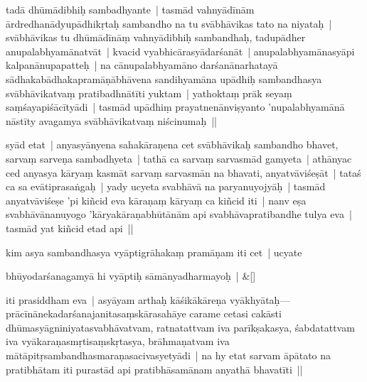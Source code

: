 \documentclass[article,12pt,a4paper]{memoir}%
\newcounter{parCount}
\begin{document}
tadā dhūmādibhiḥ sambadhyante | tasmād vahnyādīnām ārdredhanādyupādhikṛtaḥ sambandho na tu svābhāvikas tato na niyataḥ | svābhāvikas tu dhūmādīnāṃ vahnyādibhiḥ sambandhaḥ, tadupādher anupalabhyamānatvāt | kvacid vyabhicārasyādarśanāt | anupalabhyamānasyāpi kalpanānupapatteḥ | na cānupalabhyamāno darśanānarhatayā sādhakabādhakapramāṇābhāvena sandihyamāna upādhiḥ sambandhasya svābhāvikatvaṃ pratibadhnātīti yuktam | yathoktaṃ prāk seyaṃ saṃśayapiśācītyādi | tasmād upādhiṃ prayatnenānviṣyanto 'nupalabhyamānā nāstīty avagamya svābhāvikatvaṃ niścinumaḥ ||
	{}
	\pend%
      

	  \pstart \leavevmode%
	\label{thakur75-46.14}syād etat | anyasyānyena sahakāraṇena cet svābhāvikaḥ sambandho bhavet, sarvaṃ sarveṇa sambadhyeta | tathā ca sarvaṃ sarvasmād gamyeta | athānyac ced anyasya kāryaṃ kasmāt sarvaṃ sarvasmān na bhavati, anyatvāviśeṣāt | tataś ca sa evātiprasaṅgaḥ | yady ucyeta svabhāvā na paryanuyojyāḥ | tasmād anyatvāviśeṣe 'pi kiñcid eva kāraṇaṃ kāryaṃ ca kiñcid iti | nanv eṣa svabhāvānanuyogo 'kāryakāraṇabhūtānām api svabhāvapratibandhe tulya eva | tasmād yat kiñcid etad api ||\label{sarit__ratnakīrtinibandhāvali__124304}
	{}
	\pend%
      

	  \pstart \leavevmode%
	\label{thakur75-46.20}kim asya sambandhasya vyāptigrāhakaṃ pramāṇam iti cet | ucyate
	{}
	\pend%
      
	    
	    \stanza[\smallbreak]
	  bhūyodarśanagamyā hi vyāptiḥ sāmānyadharmayoḥ | \&[\smallbreak]
	  
	  
	  

	  \pstart \leavevmode%
	iti prasiddham eva | asyāyam arthaḥ kāśikākāreṇa vyākhyātaḥ—prācīnānekadarśanajanitasaṃskārasahāye carame \label{ratnakīrtinibandhāvali__36r1PF7IMVNAFWNL8S22XY2AOTX}cetasi\label{ratnakīrtinibandhāvali__36r1PF7IMVMGY4ZI43PI8JBSRTA} cakāsti dhūmasyāgniniyatasvabhāvatvam, ratnatattvam iva parīkṣakasya, śabdatattvam iva vyākaraṇasmṛtisaṃskṛtasya, brāhmaṇatvam iva mātāpitṛsambandhasmaraṇasacivasyetyādi | na hy etat sarvam āpātato na pratibhātam iti purastād api pratibhāsamānam anyathā bhavatīti ||
	{}
	\pend%
      
\end{document}
